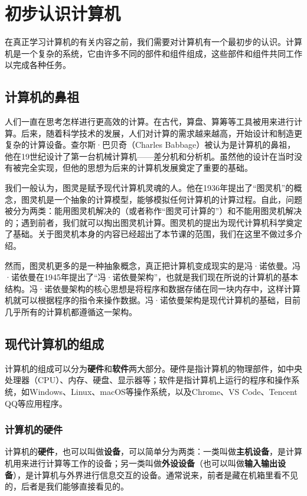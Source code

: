 \documentclass[../main.tex]{subfiles}
\begin{document}
\chapter{初步认识计算机}

在真正学习计算机的有关内容之前，我们需要对计算机有一个最初步的认识。计算机是一个复杂的系统，它由许多不同的部件和组件组成，这些部件和组件共同工作以完成各种任务。

\section{计算机的鼻祖}

人们一直在思考怎样进行更高效的计算。在古代，算盘、算筹等工具被用来进行计算。后来，随着科学技术的发展，人们对计算的需求越来越高，开始设计和制造更复杂的计算设备。查尔斯·巴贝奇（Charles Babbage）被认为是计算机的鼻祖，他在19世纪设计了第一台机械计算机——差分机和分析机。虽然他的设计在当时没有被完全实现，但他的思想为后来的计算机发展奠定了重要的基础。

我们一般认为，图灵是赋予现代计算机灵魂的人。他在1936年提出了“图灵机”的概念，图灵机是一个抽象的计算模型，能够模拟任何计算机的计算过程。自此，问题被分为两类：能用图灵机解决的（或者称作“图灵可计算的”）和不能用图灵机解决的；遇到前者，我们就可以掏出图灵机计算。图灵机的提出为现代计算机科学奠定了基础。关于图灵机本身的内容已经超出了本节课的范围，我们在这里不做过多介绍。

然而，图灵机更多的是一种抽象概念，真正把计算机变成现实的是冯·诺依曼。冯·诺依曼在1945年提出了“冯·诺依曼架构”，也就是我们现在所说的计算机的基本结构。冯·诺依曼架构的核心思想是将程序和数据存储在同一块内存中，这样计算机就可以根据程序的指令来操作数据。冯·诺依曼架构是现代计算机的基础，目前几乎所有的计算机都遵循这一架构。

\section{现代计算机的组成}

计算机的组成可以分为\textbf{硬件}和\textbf{软件}两大部分。硬件是指计算机的物理部件，如中央处理器（CPU）、内存、硬盘、显示器等；软件是指计算机上运行的程序和操作系统，如Windows、Linux、macOS等操作系统，以及Chrome、VS Code、Tencent QQ等应用程序。

\subsection{计算机的硬件}

计算机的\textbf{硬件}，也可以叫做\textbf{设备}，可以简单分为两类：一类叫做\textbf{主机设备}，是计算机用来进行计算等工作的设备；另一类叫做\textbf{外设设备}（也可以叫做\textbf{输入输出设备}），是计算机与外界进行信息交互的设备。通常说来，前者是藏在机箱里看不见的，后者是我们能够直接看见的。
\end{document}
